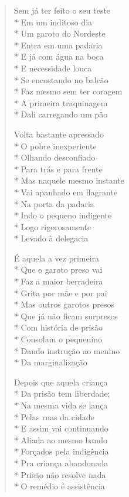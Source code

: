 \begin{verse}
Sem já ter feito o seu teste\\*
Em um inditoso dia\\*
Um garoto do Nordeste\\*
Entra em uma padaria\\*
E já com água na boca\\*
E necessidade louca\\*
Se encostando no balcão\\*
Faz mesmo sem ter coragem\\*
A primeira traquinagem\\*
Dali carregando um pão

Volta bastante apressado\\*
O pobre inexperiente\\*
Olhando desconfiado\\*
Para trás e para frente\\*
Mas naquele mesmo instante\\*
Vai apanhado em flagrante\\*
Na porta da padaria\\*
Indo o pequeno indigente\\*
Logo rigorosamente\\*
Levado à delegacia

É aquela a vez primeira\\*
Que o garoto preso vai\\*
Faz a maior berradeira\\*
Grita por mãe e por pai\\*
Mas outros garotos presos\\*
Que já não ficam surpresos\\*
Com história de prisão\\*
Consolam o pequenino\\*
Dando instrução ao menino\\*
Da marginalização

Depois que aquela criança\\*
Da prisão tem liberdade;\\*
Na mesma vida se lança\\*
Pelas ruas da cidade\\*
E assim vai continuando\\*
Aliada ao mesmo bando\\*
Forçados pela indigência\\*
Pra criança abandonada\\*
Prisão não resolve nada\\*
O remédio é assistência


\end{verse}
